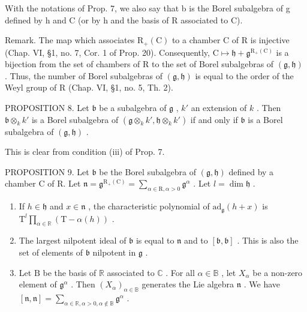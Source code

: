 With the notations of Prop. 7, we also say that b is the Borel subalgebra of g defined by h and C (or by h and the basis of R associated to C).

Remark. The map which associates \(\mathrm{R}_{+}(\mathrm{C})\) to a chamber C of R is injective (Chap. VI, §1, no. 7, Cor. 1 of Prop. 20). Consequently, \(\mathrm{C} \mapsto \mathfrak{h} + \mathfrak{g}^{\mathrm{R}_{+}(\mathrm{C})}\) is a bijection from the set of chambers of R to the set of Borel subalgebras of \((\mathfrak{g}, \mathfrak{h})\) . Thus, the number of Borel subalgebras of \((\mathfrak{g}, \mathfrak{h})\) is equal to the order of the Weyl group of R (Chap. VI, §1, no. 5, Th. 2).

PROPOSITION 8. Let \(\mathfrak{b}\) be a subalgebra of \(\mathfrak{g}\) , \(k'\) an extension of \(k\) . Then \(\mathfrak{b} \otimes_k k'\) is a Borel subalgebra of \((\mathfrak{g} \otimes_k k', \mathfrak{h} \otimes_k k')\) if and only if \(\mathfrak{b}\) is a Borel subalgebra of \((\mathfrak{g}, \mathfrak{h})\) .

This is clear from condition (iii) of Prop. 7.

PROPOSITION 9. Let \(\mathfrak{b}\) be the Borel subalgebra of \((\mathfrak{g},\mathfrak{h})\) defined by a chamber C of R. Let \(\mathfrak{n} = \mathfrak{g}^{\mathrm{R}_{+}(\mathrm{C})} = \sum_{\alpha \in \mathrm{R},\alpha >0}\mathfrak{g}^{\alpha}\) . Let \(l = \dim \mathfrak{h}\) .

\begin{enumerate}
\def\labelenumi{(\roman{enumi})}
\item
  If \(h \in \mathfrak{h}\) and \(x \in \mathfrak{n}\) , the characteristic polynomial of \(\mathrm{ad}_{\mathfrak{g}}(h + x)\) is \(\mathrm{T}^l \prod_{\alpha \in \mathbb{R}} (\mathrm{T} - \alpha(h))\) .
\item
  The largest nilpotent ideal of \(\mathfrak{b}\) is equal to \(\mathfrak{n}\) and to \([\mathfrak{b},\mathfrak{b}]\) . This is also the set of elements of \(\mathfrak{b}\) nilpotent in \(\mathfrak{g}\) .
\item
  Let \(\mathrm{B}\) be the basis of \(\mathbb{R}\) associated to \(\mathbb{C}\) . For all \(\alpha \in \mathbb{B}\) , let \(X_{\alpha}\) be a non-zero element of \(\mathfrak{g}^{\alpha}\) . Then \((X_{\alpha})_{\alpha \in \mathbb{B}}\) generates the Lie algebra \(\mathfrak{n}\) . We have \([\mathfrak{n}, \mathfrak{n}] = \sum_{\alpha \in \mathbb{R}, \alpha > 0, \alpha \notin \mathbb{B}} \mathfrak{g}^{\alpha}\) .
\end{enumerate}

